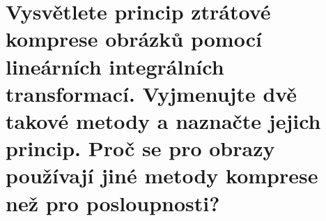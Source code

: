 \section{Vysvětlete princip ztrátové komprese obrázků pomocí lineárních integrálních transformací. Vyjmenujte dvě takové 
metody a naznačte jejich princip. Proč se pro obrazy používají jiné metody komprese než pro posloupnosti?}